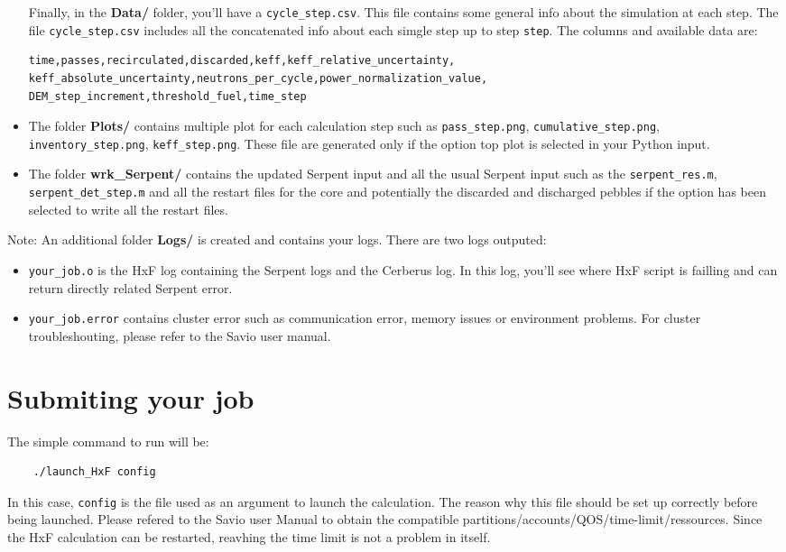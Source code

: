 \documentclass{article}
\begin{document}
\begin{itemize}
Finally, in the \textbf{Data/} folder, you'll have a \texttt{cycle\_{step}.csv}. This file contains some general info about the simulation at each step. The file \texttt{cycle\_{step}.csv} includes all the concatenated info about each simgle step up to step \texttt{step}. The columns and available data are:
\begin{verbatim}
time,passes,recirculated,discarded,keff,keff_relative_uncertainty,
keff_absolute_uncertainty,neutrons_per_cycle,power_normalization_value,
DEM_step_increment,threshold_fuel,time_step
\end{verbatim}
\item The folder \textbf{Plots/} contains multiple plot for each calculation step such as \texttt{pass\_{step}.png}, \texttt{cumulative\_{step}.png}, \texttt{inventory\_{step}.png}, \texttt{keff\_{step}.png}. These file are generated only if the option top plot is selected in your Python input. 

\item The folder \textbf{wrk\_Serpent/} contains the updated Serpent input and all the usual Serpent input such as the \texttt{serpent\_res.m}, \texttt{serpent\_det\_{step}.m} and all the restart files for the core and potentially the discarded and discharged pebbles if the option has been selected to write all the restart files. 
\end{itemize}

Note: An additional folder \textbf{Logs/} is created and contains your logs. There are two logs outputed: 
\begin{itemize}
    \item \texttt{your\_job.o} is the HxF log containing the Serpent logs and the Cerberus log. In this log, you'll see where HxF script is failling and can return directly related Serpent error. 
    \item \texttt{your\_job.error} contains cluster error such as communication error, memory issues or environment problems. For cluster troubleshouting, please refer to the Savio user manual. 
\end{itemize}
\newpage
\section{Submiting your job}
The simple command to run will be:
\begin{verbatim}
    ./launch_HxF config
\end{verbatim}
In this case, \texttt{config} is the file used as an argument to launch the calculation. The reason why this file should be set up correctly before being launched. Please refered to the Savio user Manual to obtain the compatible partitions/accounts/QOS/time-limit/ressources. Since the HxF calculation can be restarted, reavhing the time limit is not a problem in itself. 
\end{document}
